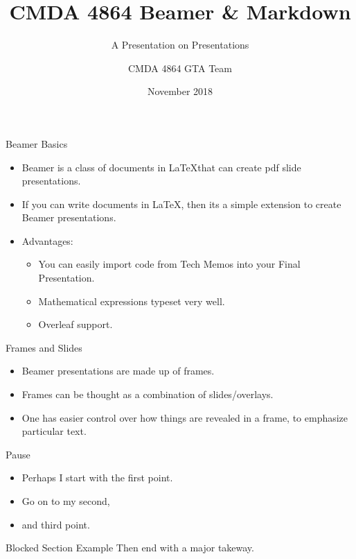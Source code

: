 \documentclass{beamer}
\title{CMDA 4864 Beamer \& Markdown}
\author{CMDA 4864 GTA Team }
\subtitle{A Presentation on Presentations}
\date{November 2018}
\begin{document}
\frame{\titlepage}

\begin{frame}{Beamer Basics}
\begin{itemize}
\item Beamer is a class of documents in \LaTeX that can create pdf slide presentations.
\item If you can write documents in \LaTeX, then its a simple extension to create Beamer presentations.
\item Advantages:
\begin{itemize}
\item You can easily import code from Tech Memos into your Final Presentation. 
\item Mathematical expressions typeset very well. 
\item Overleaf support.
\end{itemize}
\end{itemize} 
\end{frame}


\begin{frame}{Frames and Slides}
\begin{itemize}
\item Beamer presentations are made up of \alert{frames}.
\item Frames can be thought as a combination of slides/overlays.
\item One has easier control over how things are revealed in a frame, to emphasize particular text.
\end{itemize}
\end{frame}


\begin{frame}{Pause}
\begin{itemize}
\item Perhaps I start with the first point.
\item\pause Go on to my second,
\item and third point.
\end{itemize}
\pause
\begin{block}{Blocked Section Example}
Then end with a \alert{major takeway}.
\end{block}
\end{frame}
\end{document}
